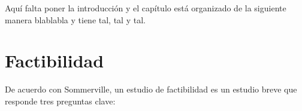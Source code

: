 





Aquí falta poner la introducción y el capítulo está organizado de la siguiente manera blablabla y tiene tal, tal y tal.


\section{Factibilidad}

De acuerdo con Sommerville\cite{sommerville_software_2011}, un estudio de factibilidad es un estudio breve que responde tres preguntas clave:

